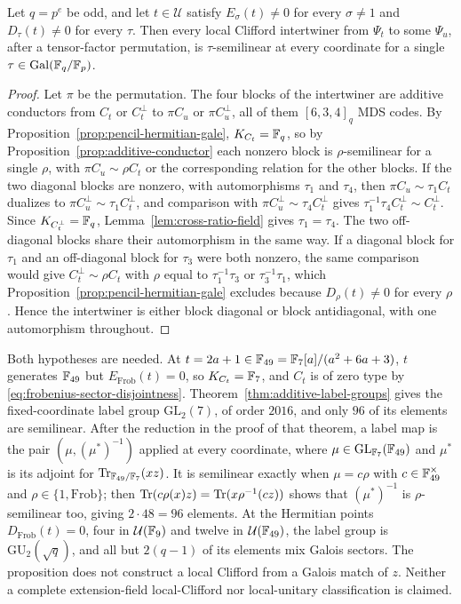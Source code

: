 \begin{proposition}
\label{prop:pencil-semilinear-intertwiners}
Let \(q=p^e\) be odd, and let \(t\in\mathcal U\) satisfy
\(E_\sigma(t)\ne0\) for every \(\sigma\ne1\) and \(D_\tau(t)\ne0\) for
every \(\tau\).  Then every local Clifford intertwiner from
\(\Psi_t\) to some \(\Psi_u\), after a tensor-factor permutation, is
\(\tau\)-semilinear at every coordinate for a single
\(\tau\in\mathrm{Gal}(\mathbb F_q/\mathbb F_p)\).
\end{proposition}

\begin{proof}
Let \(\pi\) be the permutation.  The four blocks of the intertwiner are
additive conductors from \(C_t\) or \(C_t^\perp\) to \(\pi C_u\) or
\(\pi C_u^\perp\), all of them \([6,3,4]_q\) MDS codes.  By
Proposition~\ref{prop:pencil-hermitian-gale}, \(K_{C_t}=\mathbb F_q\), so by
Proposition~\ref{prop:additive-conductor} each nonzero block is
\(\rho\)-semilinear for a single \(\rho\), with \(\pi C_u\sim\rho C_t\) or
the corresponding relation for the other blocks.  If the two diagonal blocks
are nonzero, with automorphisms \(\tau_1\) and \(\tau_4\), then
\(\pi C_u\sim\tau_1C_t\) dualizes to \(\pi C_u^\perp\sim\tau_1C_t^\perp\), and
comparison with \(\pi C_u^\perp\sim\tau_4C_t^\perp\) gives
\(\tau_1^{-1}\tau_4C_t^\perp\sim C_t^\perp\).  Since
\(K_{C_t^\perp}=\mathbb F_q\), Lemma~\ref{lem:cross-ratio-field} gives
\(\tau_1=\tau_4\).  The two off-diagonal blocks share their automorphism in
the same way.  If a diagonal block for \(\tau_1\) and an off-diagonal block
for \(\tau_3\) were both nonzero, the same comparison would give
\(C_t^\perp\sim\rho C_t\) with \(\rho\) equal to \(\tau_1^{-1}\tau_3\) or
\(\tau_3^{-1}\tau_1\), which
Proposition~\ref{prop:pencil-hermitian-gale} excludes because
\(D_\rho(t)\ne0\) for every \(\rho\).  Hence the intertwiner is either block
diagonal or block antidiagonal, with one automorphism throughout.
\end{proof}

Both hypotheses are needed.  At \(t=2a+1\in\mathbb F_{49}=\mathbb F_7[a]/(a^2+6a+3)\),
\(t\) generates \(\mathbb F_{49}\) but \(E_{\mathrm{Frob}}(t)=0\), so
\(K_{C_t}=\mathbb F_7\), and \(C_t\) is of zero type by
\eqref{eq:frobenius-sector-disjointness}.
Theorem~\ref{thm:additive-label-groups} gives the fixed-coordinate label group
\(\mathrm{GL}_2(7)\), of order \(2016\), and only \(96\) of its elements are
semilinear.  After the reduction in the proof of that theorem, a label map
is the pair \((\mu,(\mu^*)^{-1})\) applied at every coordinate, where
\(\mu\in\mathrm{GL}_{\mathbb F_7}(\mathbb F_{49})\) and \(\mu^*\) is its adjoint for
\(\operatorname{Tr}_{\mathbb F_{49}/\mathbb F_7}(xz)\).  It is semilinear exactly when \(\mu=c\rho\)
with \(c\in\mathbb F_{49}^\times\) and \(\rho\in\{1,\mathrm{Frob}\}\); then
\(\operatorname{Tr}(c\rho(x)z)=\operatorname{Tr}(x\rho^{-1}(cz))\) shows that \((\mu^*)^{-1}\) is
\(\rho\)-semilinear too, giving \(2\cdot48=96\) elements.
At the Hermitian points \(D_{\mathrm{Frob}}(t)=0\), four in
\(\mathcal U(\mathbb F_9)\) and twelve in \(\mathcal U(\mathbb F_{49})\), the label group
is \(\mathrm{GU}_2(\sqrt q)\), and all but \(2(q-1)\) of its elements mix
Galois sectors.  The proposition does not construct a local Clifford from a
Galois match of \(z\).  Neither a complete extension-field local-Clifford
nor local-unitary classification is claimed.
